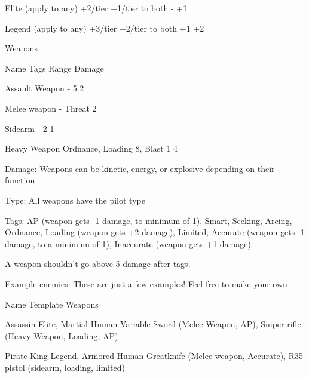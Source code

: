  Elite (apply to any)        +2/tier    +1/tier to both              -                       +1 

 Legend (apply to any)       +3/tier    +2/tier to both              +1                      +2 

                                                Weapons  

 Name                        Tags                          Range                    Damage 

 Assault Weapon               -                            5                        2 

 Melee weapon                 -                            Threat                   2 

                                                                                                         


 Sidearm                      -                             2                       1 

 Heavy Weapon                 Ordnance, Loading             8, Blast 1              4 

Damage: Weapons can be kinetic, energy, or explosive depending on their function
 
Type: All weapons have the pilot type
 
Tags: AP (weapon gets -1 damage, to minimum of 1), Smart, Seeking, Arcing, Ordnance,  
Loading (weapon gets +2 damage), Limited, Accurate (weapon gets -1 damage, to a minimum of  
1), Inaccurate (weapon gets +1 damage)
 

A weapon shouldn’t go above 5 damage after tags.
 

                                            Example enemies:  
These are just a few examples! Feel free to make your own
 

 Name                     Template                              Weapons 

 Assassin                  Elite, Martial Human                 Variable Sword (Melee  
                                                                Weapon, AP), Sniper rifle  
                                                                (Heavy Weapon, Loading,  
                                                                AP) 

 Pirate King               Legend, Armored Human                Greatknife (Melee weapon,  
                                                                Accurate), R35 pistol  
                                                                (sidearm, loading, limited) 

